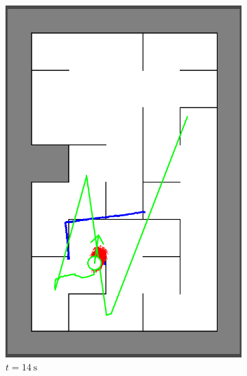 \begin{figure}[H]
\begin{subfigure}{0.2\textwidth}
         \includegraphics[width=\textwidth]{figures/localization_14s.png}
         \caption{$t = \SI{14}{\second}$}
         \label{mapping20s}
     \end{subfigure}\\
     \begin{subfigure}{0.2\textwidth}
         \centering

\end{subfigure}
\end{figure}
